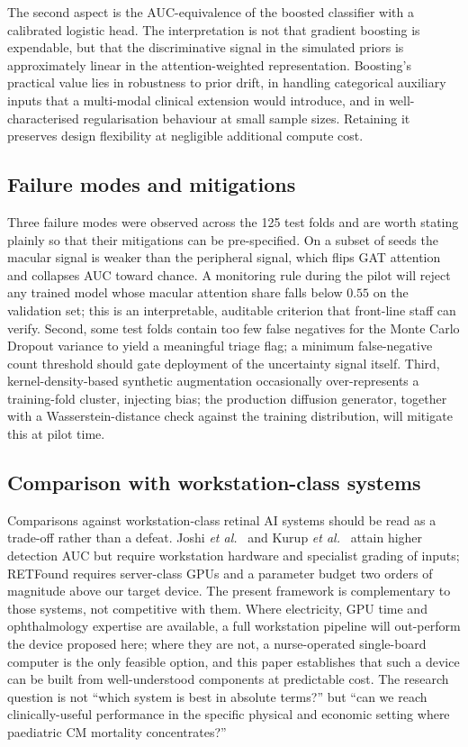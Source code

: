 \documentclass[twocolumn,10pt]{article}
\begin{document}
The second aspect is the AUC-equivalence of the boosted
classifier with a calibrated logistic head. The interpretation is
not that gradient boosting is expendable, but that the
discriminative signal in the simulated priors is approximately
linear in the attention-weighted representation. Boosting's
practical value lies in robustness to prior drift, in handling
categorical auxiliary inputs that a multi-modal clinical extension
would introduce, and in well-characterised regularisation
behaviour at small sample sizes. Retaining it preserves design
flexibility at negligible additional compute cost.

\subsection{Failure modes and mitigations}
\label{sec:failure}
Three failure modes were observed across the 125 test folds and
are worth stating plainly so that their mitigations can be
pre-specified. On a subset of seeds the macular signal is weaker
than the peripheral signal, which flips GAT attention and
collapses AUC toward chance. A monitoring rule during the pilot
will reject any trained model whose macular attention share falls
below $0.55$ on the validation set; this is an interpretable,
auditable criterion that front-line staff can verify. Second,
some test folds contain too few false negatives for the Monte
Carlo Dropout variance to yield a meaningful triage flag; a
minimum false-negative count threshold should gate deployment of
the uncertainty signal itself. Third, kernel-density-based
synthetic augmentation occasionally over-represents a
training-fold cluster, injecting bias; the production diffusion
generator, together with a Wasserstein-distance check against
the training distribution, will mitigate this at pilot time.

\subsection{Comparison with workstation-class systems}
Comparisons against workstation-class retinal AI systems should
be read as a trade-off rather than a defeat. Joshi
\emph{et al.}\ \cite{Joshi2017} and Kurup \emph{et al.}\
\cite{Kurup2023} attain higher detection AUC but require
workstation hardware and specialist grading of inputs; RETFound
\cite{Zhou2023RETFound} requires server-class GPUs and a
parameter budget two orders of magnitude above our target device.
The present framework is complementary to those systems, not
competitive with them. Where electricity, GPU time and
ophthalmology expertise are available, a full workstation
pipeline will out-perform the device proposed here; where they
are not, a nurse-operated single-board computer is the only
feasible option, and this paper establishes that such a device
can be built from well-understood components at predictable cost.
The research question is not ``which system is best in absolute
terms?'' but ``can we reach clinically-useful performance in the
specific physical and economic setting where paediatric CM
mortality concentrates?''
\end{document}
